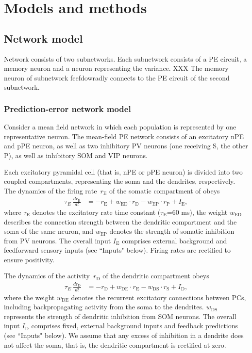 \documentclass[10pt,a4paper,draft]{article}
\begin{document}

\section*{Models and methods}
%

\subsection*{Network model}
%
Network consists of two subnetworks. Each subnetwork consists of a PE circuit, a memory neuron and a neuron representing the variance. XXX The memory neuron of subnetwork feefdowradly connects to the PE circuit of the second subnetwork.

\subsubsection*{Prediction-error network model}
%
Consider a mean field network in which each population is represented by one representative neuron. The mean-field PE network consists of an excitatory nPE and pPE neuron, as well as two inhibitory PV neurons (one receiving S, the other P), as well as inhibitory SOM and VIP neurons.

Each excitatory pyramidal cell (that is, nPE or pPE neuron) is divided into two coupled compartments, representing the soma and the dendrites, respectively. The dynamics of the firing rate~$r_{\mathrm{E}}$ of the somatic compartment of obeys \citep{wilson1972excitatory}
%
\begin{align}
\tau_E\ \frac{dr_\mathrm{E}}{dt} &= - r_\mathrm{E} + w_\mathrm{ED}\cdot  r_\mathrm{D}  -  w_\mathrm{EP}\cdot r_\mathrm{P} + I_\mathrm{E},
\end{align}
%
where $\tau_\mathrm{E}$ denotes the excitatory rate time constant ($\tau_\mathrm{E}$=60 ms), the weight $w_{\mathrm{ED}}$ describes the connection strength between the dendritic compartment and the soma of the same neuron, and $w_{\mathrm{EP}}$ denotes the strength of somatic inhibition from PV neurons. The overall input $I_\mathrm{E}$ comprises external background and feedforward sensory  inputs (see ``Inputs" below). Firing rates are rectified to ensure positivity.

The dynamics of the activity~$r_\mathrm{D}$ of the dendritic compartment obeys \citep{wilson1972excitatory}
%
\begin{align}
\tau_E\ \frac{dr_\mathrm{D}}{dt} &= - r_\mathrm{D} +  w_\mathrm{DE}\cdot r_\mathrm{E}  - w_\mathrm{DS}\cdot r_\mathrm{S} + I_\mathrm{D},
\end{align}
%
where the weight $w_{\mathrm{DE}}$ denotes the recurrent excitatory connections between PCs, including backpropagating activity from the soma to the dendrites. $w_{\mathrm{DS}}$ represents the strength of dendritic inhibition from SOM neurons. The overall input $I_\mathrm{D}$ comprises fixed, external background inputs and feedback predictions (see ``Inputs" below). We assume that any excess of inhibition in a dendrite does not affect the soma, that is, the dendritic compartment is rectified at zero. 
\end{document}
